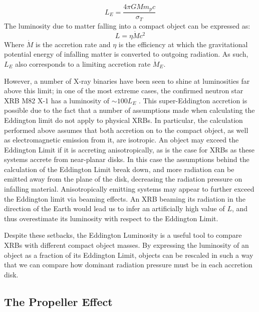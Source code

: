 \begin{equation}
L_E=\frac{4\pi GMm_pc}{\sigma_T}
\end{equation}
The luminosity due to matter falling into a compact object can be expressed as:
\begin{equation}
L=\eta\dot{M}c^2
\end{equation}
Where $\dot{M}$ is the accretion rate and $\eta$ is the efficiency at which the gravitational potential energy of infalling matter is converted to outgoing radiation.  As such, $L_E$ also corresponds to a limiting accretion rate $\dot{M}_E$.
\par However, a number of X-ray binaries have been seen to shine at luminosities far above this limit; in one of the most extreme cases, the confirmed neutron star XRB M82 X-1 has a luminosity of $\sim100L_E$ \citep{Bachetti_M82X1}.  This super-Eddington accretion is possible due to the fact that a number of assumptions made when calculating the Eddington limit do not apply to physical XRBs.  In particular, the calculation performed above assumes that both accretion on to the compact object, as well as electromagnetic emission from it, are isotropic.  An object may exceed the Eddington Limit if it is accreting anisotropically, as is the case for XRBs as these systems accrete from near-planar disks.  In this case the assumptions behind the calculation of the Eddington Limit break down, and more radiation can be emitted away from the plane of the disk, decreasing the radiation pressure on infalling material.  Anisotropically emitting systems may appear to further exceed the Eddington limit via beaming effects.  An XRB beaming its radiation in the direction of the Earth would lead us to infer an artificially high value of $L$, and thus overestimate its luminosity with respect to the Eddington Limit.
\par Despite these setbacks, the Eddington Luminosity is a useful tool to compare XRBs with different compact object masses.  By expressing the luminosity of an object as a fraction of its Eddington Limit, objects can be rescaled in such a way that we can compare how dominant radiation pressure must be in each accretion disk.

\subsection{The Propeller Effect}

